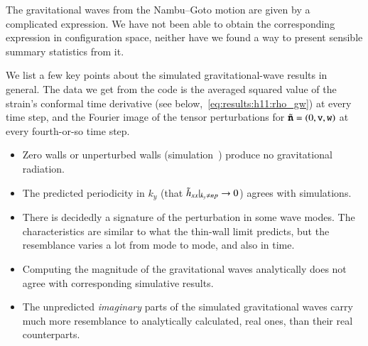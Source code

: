 


\newcommand{\polplus}{\ALIASpolplus}
\newcommand{\polcross}{\ALIASpolcross}
\newcommand\sppt{\ALIASsppt}
\newcommand\Ft{\ALIASFt}
\newcommand{\hpAB}{\ALIAShpAB}
\newcommand{\hpA}{\ALIAShpA}
\newcommand{\hpB}{\ALIAShpB}
\newcommand{\hpC}{\ALIAShpC}
\newcommand{\hpCR}{\ALIAShpCR}
\newcommand{\hpCI}{\ALIAShpCI}
\newcommand{\dummy}{\ALIASdummy}




The gravitational waves from the Nambu--Goto motion are given by a complicated expression. We have not been able to obtain the corresponding expression in configuration space, neither have we found a way to present sensible summary statistics from it. 

We list a few key points about the simulated gravitational-wave results in general. The data we get from the code is the averaged squared value of the strain's conformal time derivative (see below,~\cref{eq:results:h11:rho_gw}) at every time step, and the Fourier image of the tensor perturbations for $\tilde{\boldsymbol{\mathtt{n}}} = (0,\mathtt{v}, \mathtt{w})$ at every fourth-or-so time step.
\begin{itemize}
    \item Zero walls or unperturbed walls (simulation~) produce no gravitational radiation.
    \item The predicted periodicity in $k_y$ (that $\Ft{h}_{xx}\rvert_{k_y\neq np} \to 0 $) agrees with simulations. %
    \item There is decidedly a signature of the perturbation in some wave modes. The characteristics are similar to what the thin-wall limit predicts, but the resemblance varies a lot from mode to mode, and also in time.
    \item Computing the magnitude of the gravitational waves analytically does not agree with corresponding simulative results. %
    \item The unpredicted \emph{imaginary} parts of the simulated gravitational waves carry much more resemblance to analytically calculated, real ones, than their real counterparts.
\end{itemize}


